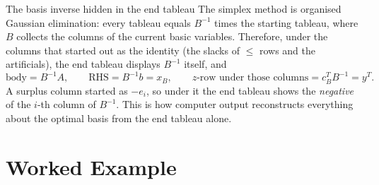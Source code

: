\begin{rulebox}{The basis inverse hidden in the end tableau}
The simplex method is organised Gaussian elimination: every tableau equals
$B^{-1}$ times the starting tableau, where $B$ collects the columns of the
current basic variables. Therefore, under the columns
that started out as the identity (the slacks of $\le$ rows and the
artificials), the end tableau displays $B^{-1}$ itself, and
\[
  \text{body}=B^{-1}A,\qquad
  \text{RHS}=B^{-1}b=x_{B},\qquad
  \text{$z$-row under those columns}=c_{B}^{T}B^{-1}=y^{T}.
\]
A surplus column started as $-e_{i}$, so under it the end tableau shows the
\emph{negative} of the $i$-th column of $B^{-1}$. This is how computer
output reconstructs everything about the optimal basis from the end tableau
alone.
\end{rulebox}

\section{Worked Example}

